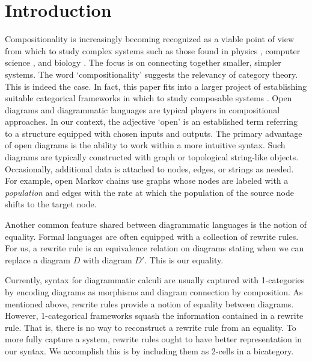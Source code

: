 \documentclass[./1--Catfying_zxCalc--Master.tex]{subfiles} %
\begin{document}
%

\section{Introduction}
\label{sec:Introduction}

Compositionality is increasingly
becoming recognized as 
a viable point of view
from which to study 
complex systems such as 
those found in physics
	\cite{AbramCoecke_CatSemanticQuantum}, 
computer science 
	\cite{SassoneSobocinski_PetriNets}, 
and biology 
	\cite{BaezFongPollard_CompMarkovProcesses}.  
The focus is on 
connecting together smaller, 
simpler systems.  
The word `compositionality' suggests 
the relevancy of category theory.
This is indeed the case.
In fact, this paper
fits into a 
larger project of
establishing suitable categorical frameworks
in which to study composable systems
\cite{BaezCoyaFong_Props,
	BaezFong_CompPassLinNets,
	BaezFongPollard_CompMarkovProcesses,
	BaezPollard_CompFrameRxNets,
	Cicala_SpansCospans,
	CicalaCourser_BicatSpansCospan,
	Pollard_OpenMarkov}.
Open diagrams and diagrammatic languages
are typical players in compositional approaches. 
In our context, the adjective `open' is 
an established term
	\cite{Dixon_OpenGraphs,
		Merry_BangGraphs,
		Pollard_OpenMarkov}
referring to a structure equipped with 
chosen inputs and outputs. 
The primary advantage of
open diagrams 
is the ability to work
within a more intuitive syntax.
Such diagrams are typically 
constructed with graph or 
topological string-like objects.  
Occasionally, additional data 
is attached to nodes, edges, or strings 
as needed. 
For example, open Markov chains
	\cite{Pollard_OpenMarkov}
use graphs whose nodes are 
labeled with a \emph{population} 
and edges with the rate at which 
the population of the source node 
shifts to the target node.  

Another common feature shared 
between diagrammatic languages is 
the notion of equality.  
Formal languages are often
equipped with a collection of rewrite rules.
For us, a rewrite rule is an equivalence relation
on diagrams stating when we can
replace a diagram $D$ with diagram $D'$.
This is our equality. 

Currently, syntax for diagrammatic calculi 
are usually captured with 1-categories
by encoding diagrams as morphisms
and diagram connection by composition. 
As mentioned above,
rewrite rules provide a notion of
equality between diagrams. 
However, 1-categorical frameworks squash 
the information contained in a rewrite rule.
That is, there is no way to reconstruct 
a rewrite rule from an equality. 
To more fully capture a system, 
rewrite rules ought to have better
representation in our syntax.
We accomplish this is by 
including them as 2-cells in a bicategory.  
\end{document}
